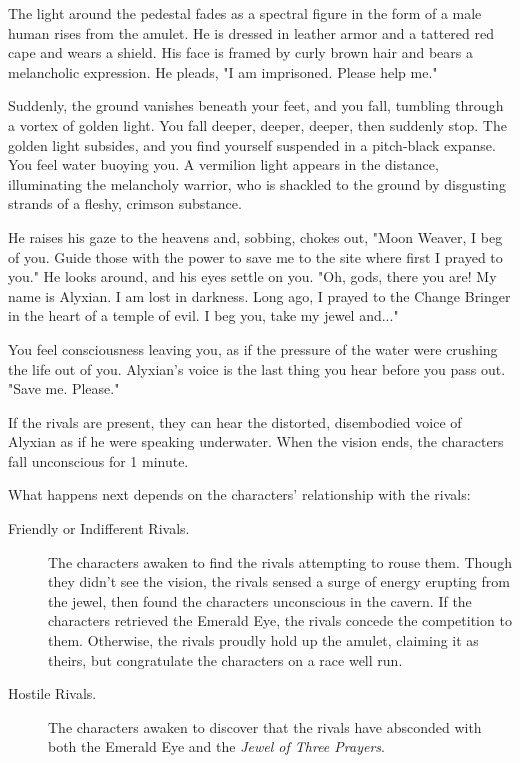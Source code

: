\documentclass[10pt,a4paper,twoside,bg=print,twocolumn,openany,nodeprecatedcode]{dndbook}
\begin{document}
\begin{DndReadAloud}{}
The light around the pedestal fades as a spectral figure in the form of a male human rises from the amulet. He is dressed in leather armor and a tattered red cape and wears a shield. His face is framed by curly brown hair and bears a melancholic expression. He pleads, "I am imprisoned. Please help me."

Suddenly, the ground vanishes beneath your feet, and you fall, tumbling through a vortex of golden light. You fall deeper, deeper, deeper, then suddenly stop. The golden light subsides, and you find yourself suspended in a pitch-black expanse. You feel water buoying you. A vermilion light appears in the distance, illuminating the melancholy warrior, who is shackled to the ground by disgusting strands of a fleshy, crimson substance.

He raises his gaze to the heavens and, sobbing, chokes out, "Moon Weaver, I beg of you. Guide those with the power to save me to the site where first I prayed to you." He looks around, and his eyes settle on you. "Oh, gods, there you are! My name is Alyxian. I am lost in darkness. Long ago, I prayed to the Change Bringer in the heart of a temple of evil. I beg you, take my jewel and..."

You feel consciousness leaving you, as if the pressure of the water were crushing the life out of you. Alyxian's voice is the last thing you hear before you pass out. "Save me. Please."

\end{DndReadAloud}

If the rivals are present, they can hear the distorted, disembodied voice of Alyxian as if he were speaking underwater. When the vision ends, the characters fall unconscious for 1 minute.

What happens next depends on the characters' relationship with the rivals:


\begin{description}
\item[Friendly or Indifferent Rivals.]
The characters awaken to find the rivals attempting to rouse them. Though they didn't see the vision, the rivals sensed a surge of energy erupting from the jewel, then found the characters unconscious in the cavern. If the characters retrieved the Emerald Eye, the rivals concede the competition to them. Otherwise, the rivals proudly hold up the amulet, claiming it as theirs, but congratulate the characters on a race well run.
\item[Hostile Rivals.]
The characters awaken to discover that the rivals have absconded with both the Emerald Eye and the \textit{Jewel of Three Prayers}.
\end{description}
\end{document}
